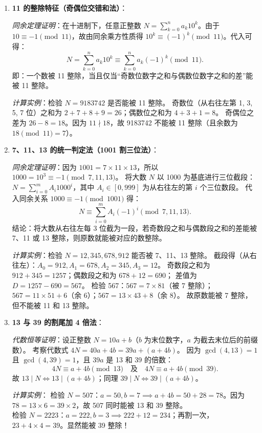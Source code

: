 \documentclass[12pt,a4paper]{ctexart}
\begin{document}
\begin{enumerate}[label=\arabic*. , leftmargin=2em, itemsep=1.2em, topsep=0.2em]
  \item \textbf{11 的整除特征（奇偶位交错和法）}：
  
  \textit{同余定理证明}：在十进制下，任意正整数 \(N = \sum_{k=0}^n a_k 10^k\)。由于 \(10 \equiv -1 \pmod{11}\)，故由同余乘方性质得 \(10^k \equiv (-1)^k \pmod{11}\)。代入可得：
  \[
  N = \sum_{k=0}^n a_k 10^k \equiv \sum_{k=0}^n a_k (-1)^k \pmod{11}.
  \]
  即：一个数被 11 整除，当且仅当“奇数位数字之和与偶数位数字之和的差”能被 11 整除。
  
  \textit{计算实例}：检验 \(N = 9183742\) 是否能被 11 整除。
  奇数位（从右往左第 1, 3, 5, 7 位）之和为 \(2 + 7 + 8 + 9 = 26\)；偶数位之和为 \(4 + 3 + 1 = 8\)。
  奇偶位之差为 \(26 - 8 = 18\)。因为 \(11 \nmid 18\)，故 9183742 不能被 11 整除（且余数为 \(18 \pmod{11} = 7\)）。

  \item \textbf{7、11、13 的统一判定法（1001 割三位法）}：
  
  \textit{同余定理证明}：因为 \(1001 = 7 \times 11 \times 13\)，所以 \(1000 = 10^3 \equiv -1 \pmod{7, 11, 13}\)。
  将大数 \(N\) 以 1000 为基底进行三位截段：\(N = \sum_{i=0}^m A_i 1000^i\)，其中 \(A_i \in [0, 999]\) 为从右往左的第 \(i\) 个三位数段。
  代入同余关系 \(1000 \equiv -1 \pmod{1001}\) 得：
  \[
  N \equiv \sum_{i=0}^m A_i (-1)^i \pmod{7, 11, 13}.
  \]
  结论：将大数从右往左每 3 位截为一段，若奇数段之和与偶数段之和的差能被 7、11 或 13 整除，则原数就能被对应的数整除。
  
  \textit{计算实例}：检验 \(N = 12,345,678,912\) 能否被 7、11、13 整除。
  截段得（从右往左）：\(A_0 = 912, A_1 = 678, A_2 = 345, A_3 = 12\)。
  奇数段之和为 \(912 + 345 = 1257\)；偶数段之和为 \(678 + 12 = 690\)；
  差值为 \(D = 1257 - 690 = 567\)。
  检验 567：\(567 = 7 \times 81\)（被 7 整除）；\(567 = 11 \times 51 + 6\)（余 6）；\(567 = 13 \times 43 + 8\)（余 8）。
  故原数能被 7 整除，但不能被 11 和 13 整除。

  \item \textbf{13 与 39 的割尾加 4 倍法}：
  
  \textit{代数恒等证明}：设正整数 \(N = 10a + b\)（\(b\) 为末位数字，\(a\) 为截去末位后的前缀数）。
  考察代数式 \(4N = 40a + 4b = 39a + (a + 4b)\)。
  因为 \(\gcd(4, 13) = 1\) 且 \(\gcd(4, 39) = 1\)，且 \(39a\) 是 13 和 39 的倍数：
  \[
  4N \equiv a + 4b \pmod{13} \quad \text{及} \quad 4N \equiv a + 4b \pmod{39}.
  \]
  故 \(13 \mid N \iff 13 \mid (a + 4b)\)；同理 \(39 \mid N \iff 39 \mid (a + 4b)\)。
  
  \textit{计算实例}：
  检验 \(N = 507\)：\(a = 50, b = 7 \implies a + 4b = 50 + 28 = 78\)。因为 \(78 = 13 \times 6 = 39 \times 2\)，故 507 同时能被 13 和 39 整除。\\
  检验 \(N = 2223\)：\(a = 222, b = 3 \implies 222 + 12 = 234\)；再割一次，\(23 + 4 \times 4 = 39\)。显然能被 39 整除！
\end{enumerate}
\end{document}
